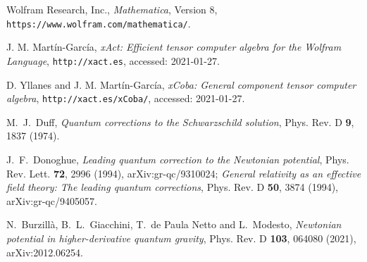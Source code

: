\documentclass[aps,prd,a4paper,twocolumn,showpacs,showkeys,preprintnumbers,amsmath,amssymb,nofootinbib,usenames,dvipsnames]{revtex4-2}
\begin{document}
\begin{thebibliography}{99}


Wolfram Research, Inc., {\it Mathematica}, Version 8,
\texttt{https://www.wolfram.com/mathematica/}.

J. M. Mart\'in-Garc\'ia, 
{\it xAct: Efficient tensor computer algebra for the Wolfram Language}, \texttt{http://xact.es}, accessed: 2021-01-27.

D. Yllanes and J. M. Mart\'in-Garc\'ia, 
{\it xCoba: General component tensor computer algebra},
\texttt{http://xact.es/xCoba/}, accessed: 2021-01-27.



M.~J.~Duff,
{\it Quantum corrections to the Schwarzschild solution},
Phys. Rev. D \textbf{9}, 1837 (1974).

J.~F.~Donoghue,
{\it Leading quantum correction to the Newtonian potential},
Phys. Rev. Lett. \textbf{72}, 2996 (1994),
arXiv:gr-qc/9310024;
{\it General relativity as an effective field theory: The leading quantum corrections},
Phys. Rev. D \textbf{50}, 3874 (1994),
arXiv:gr-qc/9405057.

N.~Burzill\`a, B.~L.~Giacchini, T.~de Paula Netto and L.~Modesto,
{\it Newtonian potential in higher-derivative quantum gravity},
Phys. Rev. D \textbf{103}, 064080 (2021),
arXiv:2012.06254.



\end{thebibliography}

\end{document}
